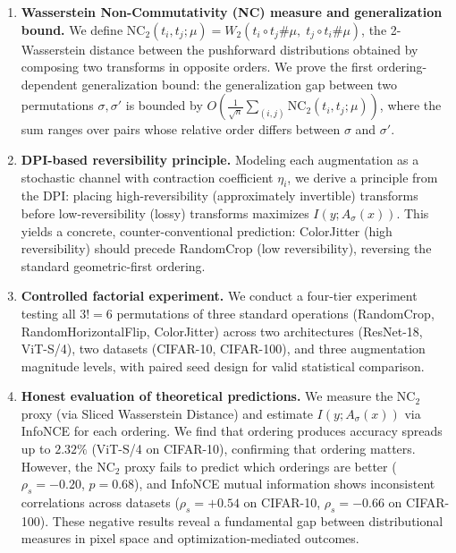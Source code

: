 \documentclass{article}
\begin{document}
\begin{enumerate}
\item \textbf{Wasserstein Non-Commutativity (NC) measure and generalization bound.} We define $\text{NC}_2(t_i, t_j; \mu) = W_2(t_i \circ t_j \# \mu,\; t_j \circ t_i \# \mu)$, the 2-Wasserstein distance between the pushforward distributions obtained by composing two transforms in opposite orders. We prove the first ordering-dependent generalization bound: the generalization gap between two permutations $\sigma, \sigma'$ is bounded by $O\!\left(\frac{1}{\sqrt{n}} \sum_{(i,j)} \text{NC}_2(t_i, t_j; \mu)\right)$, where the sum ranges over pairs whose relative order differs between $\sigma$ and $\sigma'$.

\item \textbf{DPI-based reversibility principle.} Modeling each augmentation as a stochastic channel with contraction coefficient $\eta_i$, we derive a principle from the DPI: placing high-reversibility (approximately invertible) transforms before low-reversibility (lossy) transforms maximizes $I(y; A_\sigma(x))$. This yields a concrete, counter-conventional prediction: ColorJitter (high reversibility) should precede RandomCrop (low reversibility), reversing the standard geometric-first ordering.

\item \textbf{Controlled factorial experiment.} We conduct a four-tier experiment testing all $3! = 6$ permutations of three standard operations (RandomCrop, RandomHorizontalFlip, ColorJitter) across two architectures (ResNet-18, ViT-S/4), two datasets (CIFAR-10, CIFAR-100), and three augmentation magnitude levels, with paired seed design for valid statistical comparison.

\item \textbf{Honest evaluation of theoretical predictions.} We measure the NC$_2$ proxy (via Sliced Wasserstein Distance) and estimate $I(y; A_\sigma(x))$ via InfoNCE for each ordering. We find that ordering produces accuracy spreads up to $2.32\%$ (ViT-S/4 on CIFAR-10), confirming that ordering matters. However, the NC$_2$ proxy fails to predict which orderings are better ($\rho_s = -0.20$, $p = 0.68$), and InfoNCE mutual information shows inconsistent correlations across datasets ($\rho_s = +0.54$ on CIFAR-10, $\rho_s = -0.66$ on CIFAR-100). These negative results reveal a fundamental gap between distributional measures in pixel space and optimization-mediated outcomes.
\end{enumerate}
\end{document}
